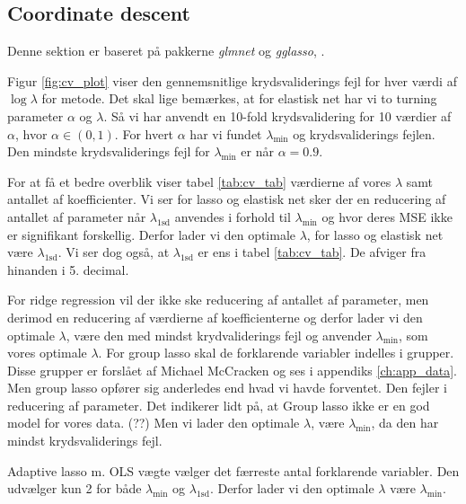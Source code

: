 \subsection{Coordinate descent}
Denne sektion er baseret på pakkerne \textit{glmnet} og \textit{gglasso}, \citep{gglasso}.

Figur \ref{fig:cv_plot} viser den gennemsnitlige krydsvaliderings fejl for hver værdi af $\log \lambda$ for metode.
Det skal lige bemærkes, at for elastisk net har vi to turning parameter $\alpha$ og $\lambda$. 
Så vi har anvendt en 10-fold krydsvalidering for 10 værdier af $\alpha$, hvor $\alpha \in (0,1)$. 
For hvert $\alpha$ har vi fundet $\lambda_{\min}$ og krydsvaliderings fejlen.  
Den mindste krydsvaliderings fejl for $\lambda_{\min}$ er når $\alpha =0.9$. 




For at få et bedre overblik viser tabel  \ref{tab:cv_tab} værdierne af vores $\lambda$ samt antallet af koefficienter. 
Vi ser for lasso og elastisk net sker der en reducering af antallet af parameter når $\lambda_{1\text{sd}}$ anvendes i forhold til $\lambda_{\min}$ og hvor deres MSE ikke er signifikant forskellig.  
Derfor lader vi den optimale $\lambda$, for lasso og elastisk net være $\lambda_{1\text{sd}}$.
Vi ser dog også, at $\lambda_{1\text{sd}}$ er ens i tabel \ref{tab:cv_tab}. 
De afviger fra hinanden i 5. decimal.  

For ridge regression vil der ikke ske reducering af antallet af parameter, men derimod en reducering af værdierne af koefficienterne og derfor lader vi den optimale $\lambda$, være den med mindst krydvaliderings fejl og anvender $\lambda_{\min}$, som vores optimale $\lambda$. 
%
For group lasso skal de forklarende variabler indelles i  grupper. 
Disse grupper er forslået af Michael McCracken og ses i appendiks \ref{ch:app_data}.
Men group lasso opfører sig anderledes end hvad vi havde forventet. 
Den fejler i reducering af parameter. 
Det indikerer lidt på, at Group lasso ikke er en god model for vores data. (??)
Men vi lader den optimale $\lambda$, være $\lambda_{\min}$, da den har mindst krydsvaliderings fejl. 

Adaptive lasso m. OLS vægte vælger det færreste antal forklarende variabler. 
Den udvælger kun 2 for både  $\lambda_{\min}$ og $\lambda_{1\text{sd}}$. 
Derfor lader vi den optimale $\lambda$ være $\lambda_{\min}$. 

